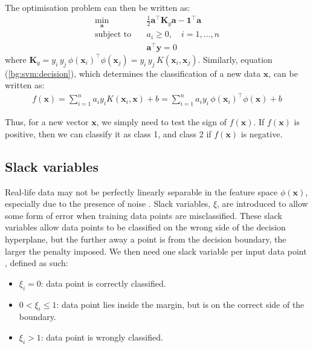 \documentclass[12pt, twoside, a4paper]{report}
\def\vec{\boldsymbol}
\begin{document}
The optimisation problem can then be written as:
\begin{align*}
\min_{\vec a} \quad &\frac{1}{2} \vec{a}^\top \vec{K}_y \vec{a} - \vec{1}^\top \vec a \\
\text{subject to} \quad &a_i \geq 0, \quad i = 1, \dots , n \\
&\vec{a}^\top \vec y = 0
\end{align*}
where $\vec{K}_y = y_i \, y_j \, \phi(\vec{x}_i)^\top \phi(\vec{x}_j) = y_i \, y_j \, K(\vec{x}_i, \vec{x}_j)$. Similarly, equation (\ref{bg:svm:decision}), which determines the classification of a new data $\vec{x}$, can be written as:
\begin{align*}
f(\vec{x}) = \sum_{i=1}^n a_i y_i K(\vec{x}_i, \vec{x}) + b = \sum_{i=1}^n a_i y_i \, \phi(\vec{x}_i)^\top \phi(\vec{x}) + b
\end{align*}

Thus, for a new vector $\vec{x}$, we simply need to test the sign of $f(\vec{x})$. If $f(\vec{x})$ is positive, then we can classify it as class 1, and class 2 if $f(\vec{x})$ is negative.

\subsection{Slack variables}
Real-life data may not be perfectly linearly separable in the feature space $\phi(\vec{x})$, especially due to the presence of noise \cite{RefWorks:127}. Slack variables, $\xi$, are introduced to allow some form of error when training data points are misclassified. These slack variables allow data points to be classified on the wrong side of the decision hyperplane, but the further away a point is from the decision boundary, the larger the penalty imposed. We then need one slack variable per input data point \cite{RefWorks:126}, defined as such:
\begin{itemize}
\item $\xi_i = 0$: data point is correctly classified.
\item $0 < \xi_i \leq 1$: data point lies inside the margin, but is on the correct side of the boundary.
\item $\xi_i > 1$: data point is wrongly classified.
\end{itemize}
\end{document}
